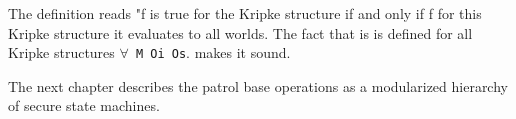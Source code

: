 \documentclass[../../main/main.tex]{subfiles}
\begin{document}
The definition reads "f is true for the Kripke structure if and only if f for this Kripke structure it evaluates to all worlds.  The fact that is is defined for all Kripke structures \texttt{$\forall$ M Oi Os}. makes it sound.  

%

%
%
%
%

The next chapter describes the patrol base operations as a modularized hierarchy of secure state machines.
\end{document}
